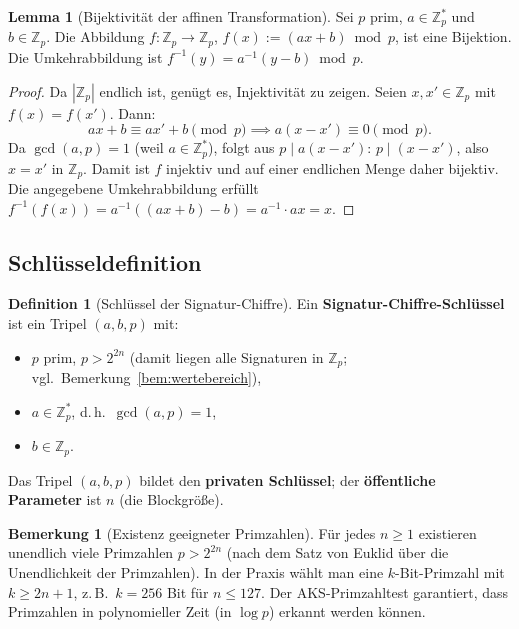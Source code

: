 ﻿\documentclass[a4paper,12pt]{scrreprt}
\theoremstyle{definition}
\newtheorem{definition}{Definition}[section]
\newtheorem{bemerkung}{Bemerkung}[section]
\newtheorem{lemma}{Lemma}[section]
\begin{document}
\begin{lemma}[Bijektivität der affinen Transformation]
	\label{lem:affin-bij}
	Sei $p$ prim, $a \in \mathbb{Z}_p^*$ und $b \in \mathbb{Z}_p$. Die Abbildung $f: \mathbb{Z}_p \to \mathbb{Z}_p$, $f(x) := (ax + b) \bmod p$, ist eine Bijektion. Die Umkehrabbildung ist $f^{-1}(y) = a^{-1}(y - b) \bmod p$.
\end{lemma}

\begin{proof}
	Da $|{\mathbb{Z}_p}|$ endlich ist, genügt es, Injektivität zu zeigen. Seien $x, x' \in \mathbb{Z}_p$ mit $f(x) = f(x')$. Dann:
	\[
	ax + b \equiv ax' + b \pmod{p} \implies a(x - x') \equiv 0 \pmod{p}.
	\]
	Da $\gcd(a, p) = 1$ (weil $a \in \mathbb{Z}_p^*$), folgt aus $p \mid a(x-x')$: $p \mid (x - x')$, also $x = x'$ in $\mathbb{Z}_p$. Damit ist $f$ injektiv und auf einer endlichen Menge daher bijektiv. Die angegebene Umkehrabbildung erfüllt $f^{-1}(f(x)) = a^{-1}((ax+b) - b) = a^{-1} \cdot ax = x$.
\end{proof}

\subsection{Schlüsseldefinition}

\begin{definition}[Schlüssel der Signatur-Chiffre]
	\label{def:schluessel}
	Ein \textbf{Signatur-Chiffre-Schlüssel} ist ein Tripel $(a, b, p)$ mit:
	\begin{itemize}
		\item $p$ prim, $p > 2^{2n}$ (damit liegen alle Signaturen in $\mathbb{Z}_p$; vgl.\ Bemerkung~\ref{bem:wertebereich}),
		\item $a \in \mathbb{Z}_p^*$, d.\,h.\ $\gcd(a, p) = 1$,
		\item $b \in \mathbb{Z}_p$.
	\end{itemize}
	Das Tripel $(a, b, p)$ bildet den \textbf{privaten Schlüssel}; der \textbf{öffentliche Parameter} ist $n$ (die Blockgröße).
\end{definition}

\begin{bemerkung}[Existenz geeigneter Primzahlen]
	Für jedes $n \geq 1$ existieren unendlich viele Primzahlen $p > 2^{2n}$ (nach dem Satz von Euklid über die Unendlichkeit der Primzahlen). In der Praxis wählt man eine $k$-Bit-Primzahl mit $k \geq 2n + 1$, z.\,B.\ $k = 256$ Bit für $n \leq 127$. Der AKS-Primzahltest \cite{AKS04} garantiert, dass Primzahlen in polynomieller Zeit (in $\log p$) erkannt werden können.
\end{bemerkung}
\end{document}
